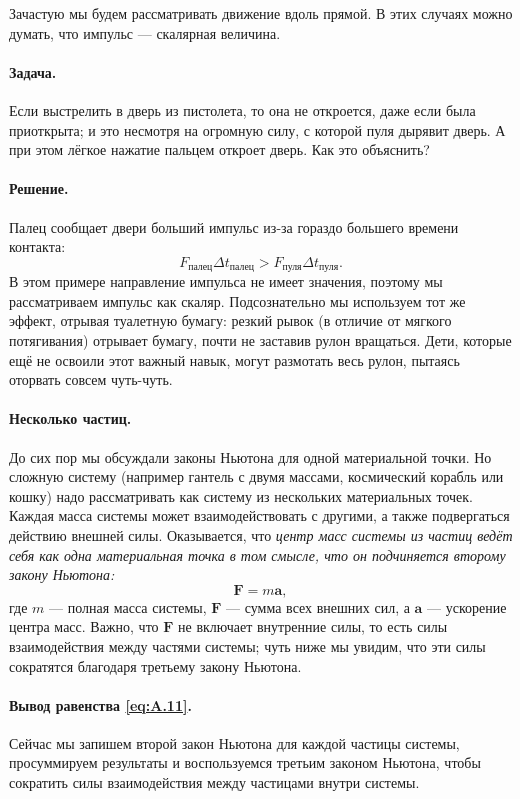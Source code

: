 Зачастую мы будем рассматривать движение вдоль прямой.
В этих случаях можно думать, что импульс --- скалярная величина.

\paragraph{Задача.}
Если выстрелить в дверь из пистолета, то она не откроется, даже если была приоткрыта;
и это несмотря на огромную силу, с которой пуля дырявит дверь.
А при этом лёгкое нажатие пальцем откроет дверь.
Как это объяснить?

\paragraph{Решение.}
Палец сообщает двери больший импульс
из-за гораздо большего времени контакта:
\[
F_{\text{палец}}  \Delta t_{\text{палец}}
>
F_{\text{пуля}}  \Delta t_{\text{пуля}}.
\]
В этом примере направление импульса не имеет значения, поэтому мы рассматриваем импульс как скаляр.
Подсознательно мы используем тот же эффект, отрывая туалетную бумагу:
резкий рывок (в отличие от мягкого потягивания) отрывает бумагу, почти не заставив
рулон вращаться.
Дети, которые ещё не освоили этот важный навык, могут размотать весь рулон, пытаясь оторвать совсем чуть-чуть.

\paragraph{Несколько частиц.}
До сих пор мы обсуждали законы Ньютона для одной материальной точки.
Но сложную систему (например гантель с двумя массами, космический корабль или кошку) надо рассматривать как систему из нескольких материальных точек.
Каждая масса системы может взаимодействовать с другими, а также подвергаться
действию внешней силы.
Оказывается, что \emph{центр масс системы из частиц ведёт себя как одна материальная точка в том смысле, что он подчиняется второму закону Ньютона:}
\begin{equation}
\mathbf{F}=m \mathbf{a},
\label{eq:A.11}
\end{equation}
где $m$ --- полная масса системы, $\mathbf{F}$ --- сумма всех внешних сил,
а $\mathbf{a}$ --- ускорение центра масс.
Важно, что $\mathbf{F}$ не включает внутренние силы, то есть силы взаимодействия между частями системы;
чуть ниже мы увидим, что эти силы сократятся благодаря третьему закону Ньютона.

\paragraph{Вывод равенства \eqref{eq:A.11}.}
Сейчас мы запишем второй закон Ньютона для каждой частицы системы, просуммируем результаты и воспользуемся
третьим законом Ньютона, чтобы сократить силы взаимодействия между частицами внутри системы.

